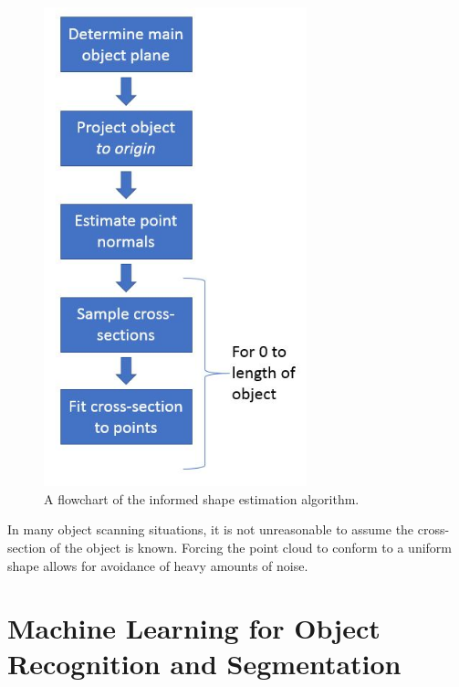 \documentclass[12pt]{drexelthesis}
\let\Oldsection\section
\renewcommand{\section}{\FloatBarrier\Oldsection}
\begin{document}
\begin{figure}[!h]
	\centering
		\includegraphics[width=3in]{cross-section-estimation/flowchart.jpg}
	\caption[Flow chart of informed shape estimation algorithm]{\centering A flowchart of the informed shape estimation algorithm.}
\end{figure}

In many object scanning situations, it is not unreasonable to assume the cross-section of the object is known. Forcing the point cloud to conform to a uniform shape allows for avoidance of heavy amounts of noise.




 


\section{Machine Learning for Object Recognition and Segmentation}
\label{sec:machinelearning}
\end{document}

